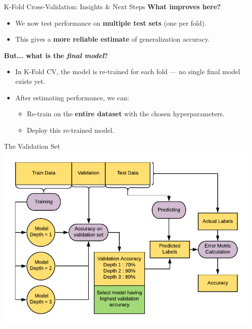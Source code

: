 \documentclass{beamer}
\begin{document}
\begin{frame}{K-Fold Cross-Validation: Insights \& Next Steps}
\textbf{What improves here?}
\begin{itemize}
    \item We now test performance on \textbf{multiple test sets} (one per fold).
    \item This gives a \textbf{more reliable estimate} of generalization accuracy.
\end{itemize}

\pause
\textbf{But... what is the \emph{final model}?}
\begin{itemize}
    \item In K-Fold CV, the model is re-trained for each fold — no single final model exists yet.
    \item After estimating performance, we can:
    \begin{itemize}
        \item Re-train on the \textbf{entire dataset} with the chosen hyperparameters.
        \item Deploy this re-trained model.
    \end{itemize}
\end{itemize}
\end{frame}

	\begin{frame}{The Validation Set}
	\includegraphics[width = \textwidth]{../assets/bias-variance/diagrams/validation-workflow}
	\end{frame}
\end{document}
